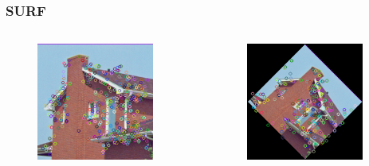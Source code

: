 \documentclass[presentation,aspectratio=1610]{beamer}
\begin{document}
\begin{frame}
	\frametitle{SURF}
	\begin{columns}
		\begin{figure}[htbp!]
			\centering
			\includegraphics[width=0.9\textwidth]{surf/img_1_feature.png}
		\end{figure}
		
		\begin{figure}[htbp!]
			\centering
			\includegraphics[width=0.9\textwidth]{surf/img_2_feature.png}
		\end{figure}	
		

\end{columns}
\end{frame}
\end{document}
